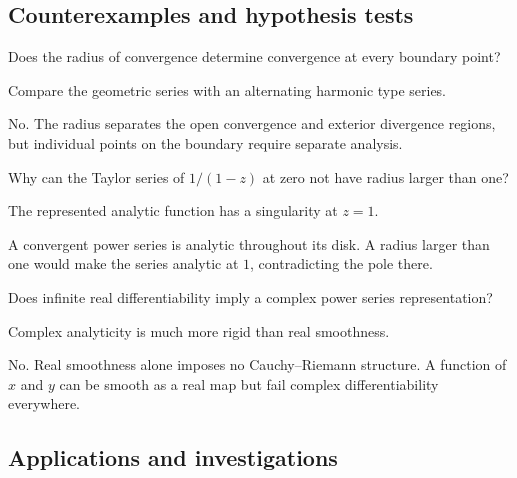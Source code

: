 \subsection*{Counterexamples and hypothesis tests}

\begin{exercise}\label{exr:iv03-expand-10}
Does the radius of convergence determine convergence at every boundary point?
\end{exercise}
\begin{hint}
Compare the geometric series with an alternating harmonic type series.
\end{hint}
\begin{solution}
No. The radius separates the open convergence and exterior divergence regions, but individual points on the boundary require separate analysis.
\end{solution}

\begin{exercise}\label{exr:iv03-expand-11}
Why can the Taylor series of \(1/(1-z)\) at zero not have radius larger than one?
\end{exercise}
\begin{hint}
The represented analytic function has a singularity at \(z=1\).
\end{hint}
\begin{solution}
A convergent power series is analytic throughout its disk. A radius larger than one would make the series analytic at \(1\), contradicting the pole there.
\end{solution}

\begin{exercise}\label{exr:iv03-expand-12}
Does infinite real differentiability imply a complex power series representation?
\end{exercise}
\begin{hint}
Complex analyticity is much more rigid than real smoothness.
\end{hint}
\begin{solution}
No. Real smoothness alone imposes no Cauchy--Riemann structure. A function of \(x\) and \(y\) can be smooth as a real map but fail complex differentiability everywhere.
\end{solution}

\subsection*{Applications and investigations}

